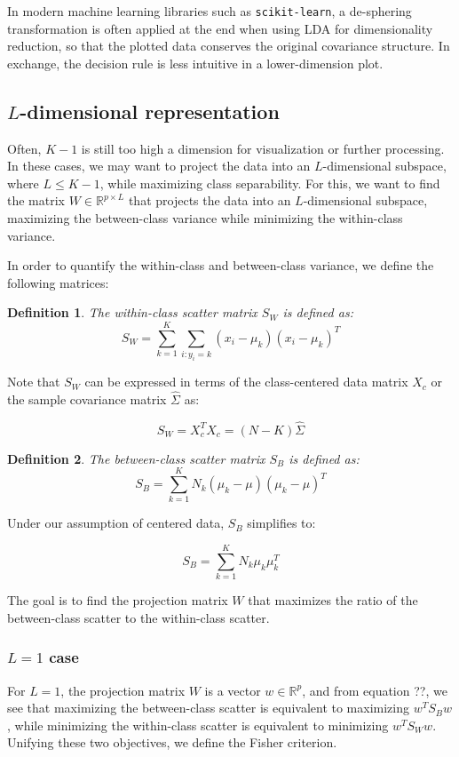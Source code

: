 \documentclass[a4paper,12pt]{article}
\newtheorem{definition}{Definition}
\begin{document}
In modern machine learning libraries such as \texttt{scikit-learn}, a de-sphering transformation is often applied at the end when using LDA for dimensionality reduction, so that the plotted data conserves the original covariance structure. In exchange, the decision rule is less intuitive in a lower-dimension plot.

\subsection{$L$-dimensional representation}
Often, $K-1$ is still too high a dimension for visualization or further processing. In these cases, we may want to project the data into an $L$-dimensional subspace, where $L \leq K-1$, while maximizing class separability. For this, we want to find the matrix $W \in \mathbb{R}^{p \times L}$ that projects the data into an $L$-dimensional subspace, maximizing the between-class variance while minimizing the within-class variance.

In order to quantify the within-class and between-class variance, we define the following matrices:

\begin{definition}
The within-class scatter matrix $S_W$ is defined as:
\[
S_W = \sum_{k=1}^K \sum_{i: y_i = k} (x_i - \mu_k)(x_i - \mu_k)^T
\]
\end{definition}

Note that $S_W$ can be expressed in terms of the class-centered data matrix $X_c$ or the sample covariance matrix $\hat{\Sigma}$ as:

\[
S_W = X_c^T X_c = (N - K) \hat{\Sigma}
\]

\begin{definition}
The between-class scatter matrix $S_B$ is defined as:
\[
S_B = \sum_{k=1}^K N_k (\mu_k - \mu)(\mu_k - \mu)^T
\]
\end{definition}

Under our assumption of centered data, $S_B$ simplifies to:

\[
S_B = \sum_{k=1}^K N_k \mu_k \mu_k^T
\]

The goal is to find the projection matrix $W$ that maximizes the ratio of the between-class scatter to the within-class scatter.

\subsubsection{$L=1$ case}
For $L=1$, the projection matrix $W$ is a vector $w \in \mathbb{R}^p$, and from equation ??, we see that maximizing the between-class scatter is equivalent to maximizing $w^T S_B w$, while minimizing the within-class scatter is equivalent to minimizing $w^T S_W w$. Unifying these two objectives, we define the Fisher criterion.
\end{document}
